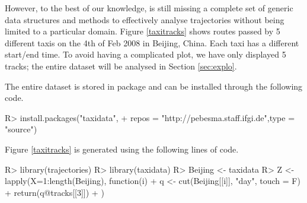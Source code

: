 \documentclass[article]{jss}
\begin{document}
However, to the best of our knowledge,  is still missing a complete set of generic data structures and methods to effectively analyse trajectories without being limited to a particular domain. Figure \ref{taxitracks} shows routes passed by 5 different taxis on the 4th of Feb 2008 in Beijing, China. Each taxi has a different start/end time. To avoid having a complicated plot, we have only displayed 5 tracks; the entire dataset will be analysed in Section \ref{sec:explo}.

The entire dataset is stored in  package    and can be installed through the following code.
\begin{Schunk}
\begin{Sinput}
R> install.packages("taxidata", 
+   repos = "http://pebesma.staff.ifgi.de",type = "source")
\end{Sinput}
\end{Schunk}

Figure \ref{taxitracks} is generated using the following lines of code.

\begin{Schunk}
\begin{Sinput}
R> library(trajectories)
R> library(taxidata)
R> Beijing <- taxidata
R> Z <- lapply(X=1:length(Beijing), function(i){
+    q <-  cut(Beijing[[i]], "day", touch = F)
+    return(q@tracks[[3]])
+  })
\end{Sinput}
\end{Schunk}
\end{document}
